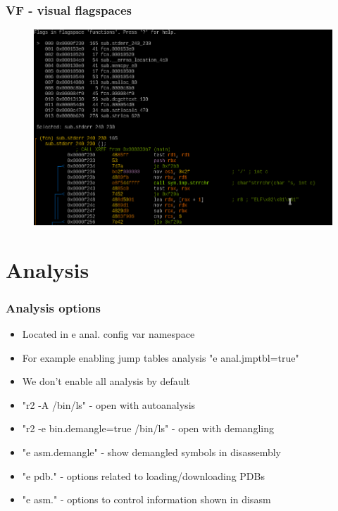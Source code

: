 \documentclass[10pt,pdf,utf8,english,compress,hyperref={unicode}]{beamer}
\begin{document}
\begin{frame}[fragile]
	\frametitle{VF - visual flagspaces}
	\begin{figure}
		\includegraphics[width=\linewidth]{r2visualflagspace.png}
	\end{figure}
\end{frame}

\section{Analysis}

\begin{frame}[fragile]
  \frametitle{Analysis options}
  \begin{itemize}
	  \item Located in e anal. config var namespace
	  \item For example enabling jump tables analysis "e anal.jmptbl=true"
	  \item We don't enable all analysis by default
	  \item "r2 -A /bin/ls" - open with autoanalysis
	  \item "r2 -e bin.demangle=true /bin/ls" - open with demangling
	  \item "e asm.demangle" - show demangled symbols in disassembly
	  \item "e pdb." - options related to loading/downloading PDBs
	  \item "e asm." - options to control information shown in disasm
  \end{itemize}
\end{frame}
\end{document}
